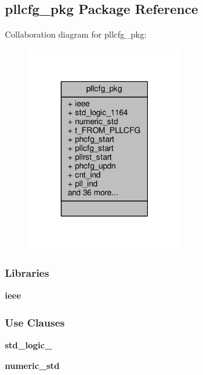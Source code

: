 \subsection{pllcfg\+\_\+pkg Package Reference}
\label{classpllcfg__pkg}


Collaboration diagram for pllcfg\+\_\+pkg\+:\nopagebreak
\begin{figure}[H]
\begin{center}
\leavevmode
\includegraphics[width=187pt]{d2/da3/classpllcfg__pkg__coll__graph}
\end{center}
\end{figure}
\subsubsection*{Libraries}
 \begin{DoxyCompactItemize}
\item 
{\bf ieee} 
\end{DoxyCompactItemize}
\subsubsection*{Use Clauses}
 \begin{DoxyCompactItemize}
\item 
{\bf std\+\_\+logic\+\_}   
\item 
{\bf numeric\+\_\+std}   
\end{DoxyCompactItemize}
